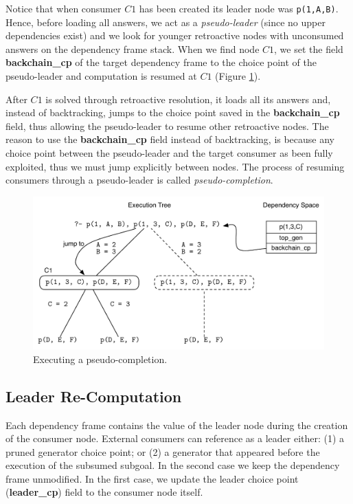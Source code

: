 Notice that when consumer $C1$ has been created its leader node was
\texttt{p(1,A,B)}. Hence, before loading all answers, we act as a \textit{pseudo-leader} (since no upper
dependencies exist) and we look for younger retroactive nodes with unconsumed answers on the dependency
frame stack. When we find node $C1$, we set the field \textbf{backchain\_cp} of the target dependency
frame to the choice point of the pseudo-leader and computation is resumed at $C1$
(Figure \ref{fig:retro_pseudo_completion2}).

After $C1$ is solved
through retroactive resolution, it loads all its answers and, instead of backtracking, jumps to the choice
point saved in the \textbf{backchain\_cp} field, thus allowing the pseudo-leader to resume other retroactive
nodes. The reason to use the \textbf{backchain\_cp} field instead of backtracking, is because any choice
point between the pseudo-leader and the target consumer as been fully exploited, thus we must jump explicitly
between nodes. The process of resuming consumers through a pseudo-leader is called \textit{pseudo-completion}.

\begin{figure}[ht]
  \centering
    \includegraphics[scale=0.6]{retro_pseudo_completion2.pdf}
  \caption{Executing a pseudo-completion.}
  \label{fig:retro_pseudo_completion2}
\end{figure}

\subsection{Leader Re-Computation}

Each dependency frame contains the value of the leader node during the creation of the consumer node.
External consumers can reference as a leader either: (1) a pruned generator choice point; or (2) a
generator that appeared before the execution of the subsumed subgoal. In the second case we keep
the dependency frame unmodified. In the first case, we update the leader choice point (\textbf{leader\_cp})
field to the consumer node itself.

